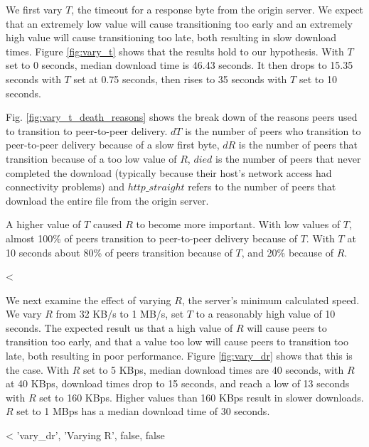 We first vary $T$, the timeout for a response byte from the origin server. We expect that an extremely low value 
will cause transitioning too early and an extremely high value 
will cause transitioning too late, both resulting in slow download times. Figure \ref{fig:vary_t} shows that 
the results hold to our hypothesis. With $T$ set to 0 seconds, median download time is 46.43 seconds. It then drops to 15.35 seconds with $T$ set at 0.75 seconds, 
then rises to 35 seconds with $T$ set to 10 seconds.

Fig. \ref{fig:vary_t_death_reasons} shows the break down of the reasons peers used to transition to peer-to-peer delivery.  $dT$ is the number
of peers who transition to peer-to-peer delivery because of a slow first byte, $dR$ is the number of
peers that transition because of a too low value of $R$, $died$ is the number of peers that never completed the download
(typically because their host's network access had connectivity problems) and $http\_straight$ refers to the number of peers
that download the entire file from the origin server.

A higher value of $T$ caused $R$ to become more important.  With low values of $T$, almost 100\% of peers transition to peer-to-peer delivery because of $T$. 
With $T$ at 10 seconds about 80\% of peers transition because of $T$, and 20\% because of $R$.

<%

We next examine the effect of varying $R$, the server's minimum calculated speed.  We vary $R$ from 32 KB/s to 1 MB/s, set $T$ to a 
reasonably high value of 10 seconds. The expected result us that a high value of $R$ will cause peers to transition 
too early, and that a value too low will cause peers to transition too late, both resulting in poor performance. Figure \ref{fig:vary_dr} shows that this is the case.
With $R$ set to 5 KBps, median download times are 40 seconds, with $R$ at 40 KBps, download times drop to 15 seconds, and reach
a low of 13 seconds with $R$ set to 160 KBps. Higher values than 160 KBps result in slower downloads.  $R$ set to 1 MBps has a median download time of 30 seconds. 

<%
  'vary_dr', 'Varying R', false, false %

